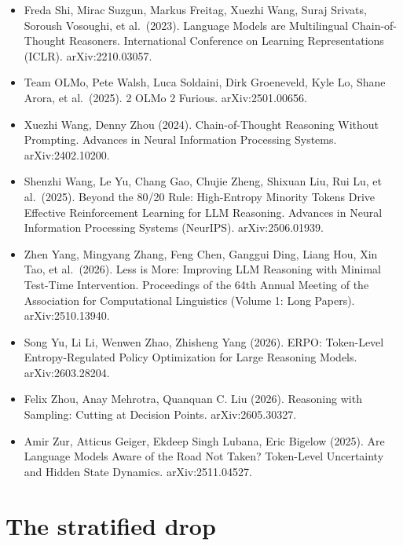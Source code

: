 \documentclass[
  10pt,
  a4paper,
]{article}
\begin{document}
\begin{itemize}
\item
  Freda Shi, Mirac Suzgun, Markus Freitag, Xuezhi Wang, Suraj Srivats, Soroush Vosoughi, et al.~(2023). Language Models are Multilingual Chain-of-Thought Reasoners. International Conference on
  Learning Representations (ICLR). arXiv:2210.03057.
\item
  Team OLMo, Pete Walsh, Luca Soldaini, Dirk Groeneveld, Kyle Lo, Shane Arora, et al.~(2025). 2 OLMo 2 Furious. arXiv:2501.00656.
\item
  Xuezhi Wang, Denny Zhou (2024). Chain-of-Thought Reasoning Without Prompting. Advances in Neural Information Processing Systems. arXiv:2402.10200.
\item
  Shenzhi Wang, Le Yu, Chang Gao, Chujie Zheng, Shixuan Liu, Rui Lu, et al.~(2025). Beyond the 80/20 Rule: High-Entropy Minority Tokens Drive Effective Reinforcement Learning for LLM Reasoning.
  Advances in Neural Information Processing Systems (NeurIPS). arXiv:2506.01939.
\item
  Zhen Yang, Mingyang Zhang, Feng Chen, Ganggui Ding, Liang Hou, Xin Tao, et al.~(2026). Less is More: Improving LLM Reasoning with Minimal Test-Time Intervention. Proceedings of the 64th Annual
  Meeting of the Association for Computational Linguistics (Volume 1: Long Papers). arXiv:2510.13940.
\item
  Song Yu, Li Li, Wenwen Zhao, Zhisheng Yang (2026). ERPO: Token-Level Entropy-Regulated Policy Optimization for Large Reasoning Models. arXiv:2603.28204.
\item
  Felix Zhou, Anay Mehrotra, Quanquan C. Liu (2026). Reasoning with Sampling: Cutting at Decision Points. arXiv:2605.30327.
\item
  Amir Zur, Atticus Geiger, Ekdeep Singh Lubana, Eric Bigelow (2025). Are Language Models Aware of the Road Not Taken? Token-Level Uncertainty and Hidden State Dynamics. arXiv:2511.04527.
\end{itemize}

\endgroup
\appendix

\hypertarget{the-stratified-drop}{%
\section{The stratified drop}\label{the-stratified-drop}}
\end{document}
